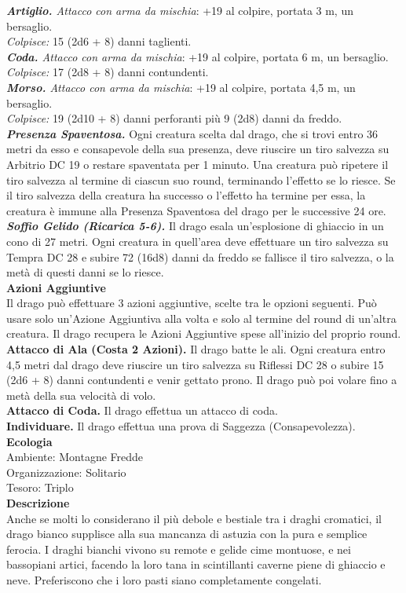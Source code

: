 \begin{multicols}{2}
\emph{\textbf{Artiglio.} Attacco con arma da mischia}: +19 al colpire, portata 3 m, un bersaglio.\\
\emph{Colpisce:} 15 (2d6 + 8) danni taglienti.\\
\emph{\textbf{Coda.} Attacco con arma da mischia}: +19 al colpire, portata 6 m, un bersaglio.\\
\emph{Colpisce:} 17 (2d8 + 8) danni contundenti. \\
\emph{\textbf{Morso.} Attacco con arma da mischia}: +19 al colpire, portata 4,5 m, un bersaglio.\\
\emph{Colpisce:} 19 (2d10 + 8) danni perforanti più 9 (2d8) danni da freddo.\\
\emph{\textbf{Presenza Spaventosa.}} Ogni creatura scelta dal drago, che si trovi entro 36 metri da esso e consapevole della sua presenza, deve riuscire un tiro salvezza su Arbitrio DC  19 o restare spaventata per 1 minuto. Una creatura può ripetere il tiro salvezza al termine di ciascun suo round, terminando l'effetto se lo riesce. Se il tiro salvezza della creatura ha successo o l'effetto ha termine per essa, la creatura è immune alla Presenza Spaventosa del drago per le successive 24 ore.\\
\emph{\textbf{Soffio Gelido (Ricarica 5-6).}} Il drago esala un'esplosione di ghiaccio in un cono di 27 metri. Ogni creatura in quell'area deve effettuare un tiro salvezza su Tempra DC  28 e subire 72 (16d8) danni da freddo se fallisce il tiro salvezza, o la metà di questi danni se lo riesce.\\
\textbf{Azioni Aggiuntive}\\
Il drago può effettuare 3 azioni aggiuntive, scelte tra le opzioni seguenti. Può usare solo un'Azione Aggiuntiva alla volta e solo al termine del round di un'altra creatura. Il drago recupera le Azioni Aggiuntive spese all'inizio del proprio round.\\
\textbf{Attacco di Ala (Costa 2 Azioni).} Il drago batte le ali. Ogni creatura entro 4,5 metri dal drago deve riuscire un tiro salvezza su Riflessi DC  28 o subire 15 (2d6 + 8) danni contundenti e venir gettato prono. Il drago può poi volare fino a metà della sua velocità di volo.\\
\textbf{Attacco di Coda.} Il drago effettua un attacco di coda.\\
\textbf{Individuare.} Il drago effettua una prova di Saggezza (Consapevolezza).\\
\textbf{Ecologia}\\
Ambiente: Montagne Fredde\\
Organizzazione: Solitario\\
Tesoro: Triplo\\
\textbf{Descrizione}\\
Anche se molti lo considerano il più debole e bestiale tra i draghi cromatici, il drago bianco supplisce alla sua mancanza di astuzia con la pura e semplice ferocia. I draghi bianchi vivono su remote e gelide cime montuose, e nei bassopiani artici, facendo la loro tana in scintillanti caverne piene di ghiaccio e neve. Preferiscono che i loro pasti siano completamente congelati.\\



\end{multicols}
